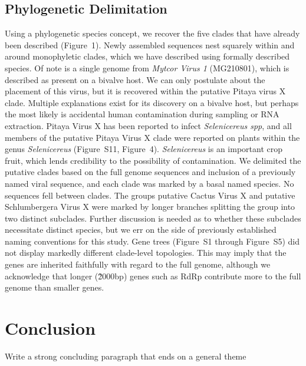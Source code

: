 \documentclass[fleqn,10pt,lineno]{wlpeerj}
\begin{document}
{\subsection*{Phylogenetic Delimitation}
Using a phylogenetic species concept, we recover the five clades that have already been described ({Figure~1}).
Newly assembled sequences nest squarely within and around monophyletic clades, which we have described using formally described species. 
Of note is a single genome from \textit{Mytcor Virus 1} (MG210801), which is described as present on a bivalve host. 
We can only postulate about the placement of this virus, but it is recovered within the putative Pitaya virus X clade.
Multiple explanations exist for its discovery on a bivalve host, but perhaps the most likely is accidental human contamination during sampling or RNA extraction.
Pitaya Virus X has been reported to infect \textit{Selenicereus spp}, and all members of the putative Pitaya Virus X clade were reported on  plants within the genus \textit{Selenicereus} ({Figure~S11}, {Figure~4}).
\textit{Selenicereus} is an important crop fruit, which lends credibility to the possibility of contamination. 
We delimited the putative clades based on the full genome sequences and inclusion of a previously named viral sequence, and each clade was marked by a basal named species.
No sequences fell between clades.
The groups putative Cactus Virus X and putative Schlumbergera Virus X were marked by longer branches splitting the group into two distinct subclades. 
Further discussion is needed as to whether these subclades necessitate distinct species, but we err on the side of previously established naming conventions for this study.
Gene trees ({Figure~S1} through {Figure~S5}) did not display markedly different clade-level topologies. 
This may imply that the genes are inherited faithfully with regard to the full genome, although we acknowledge that longer (\~2000bp) genes such as RdRp contribute more to the full genome than smaller genes.


\section*{Conclusion}



Write a strong concluding paragraph that ends on a general theme


}
\end{document}
